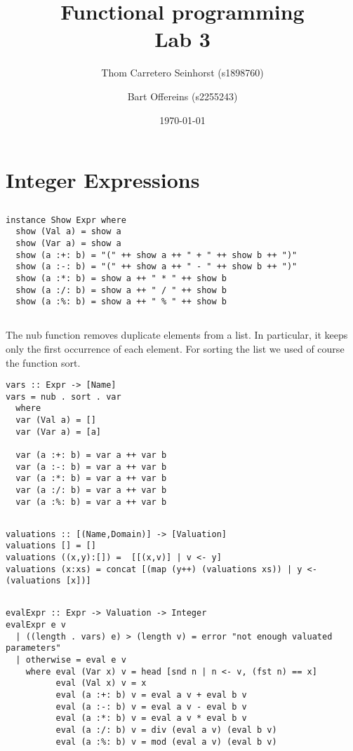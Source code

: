 \documentclass[a4paper,11pt]{article}
\author{Thom Carretero Seinhorst (s1898760) \and Bart Offereins (s2255243)}
\date{\today}
\title{Functional programming \\Lab 3}
\begin{document}
  \maketitle

\section{Integer Expressions}
\subsection{}
\begin{lstlisting}
instance Show Expr where
  show (Val a) = show a
  show (Var a) = show a
  show (a :+: b) = "(" ++ show a ++ " + " ++ show b ++ ")"
  show (a :-: b) = "(" ++ show a ++ " - " ++ show b ++ ")"
  show (a :*: b) = show a ++ " * " ++ show b
  show (a :/: b) = show a ++ " / " ++ show b
  show (a :%: b) = show a ++ " % " ++ show b
\end{lstlisting}

\subsection{}
The nub function removes duplicate elements from a list. In particular, it keeps only the first occurrence of each element. For sorting the list we used of course the function sort. 
\begin{lstlisting}
vars :: Expr -> [Name]
vars = nub . sort . var
  where
  var (Val a) = []
  var (Var a) = [a]

  var (a :+: b) = var a ++ var b
  var (a :-: b) = var a ++ var b
  var (a :*: b) = var a ++ var b
  var (a :/: b) = var a ++ var b
  var (a :%: b) = var a ++ var b
\end{lstlisting}

\subsection{}
\begin{lstlisting}
valuations :: [(Name,Domain)] -> [Valuation]
valuations [] = []
valuations ((x,y):[]) =  [[(x,v)] | v <- y]
valuations (x:xs) = concat [(map (y++) (valuations xs)) | y <- (valuations [x])]
\end{lstlisting}

\subsection{}
\begin{lstlisting}
evalExpr :: Expr -> Valuation -> Integer
evalExpr e v
  | ((length . vars) e) > (length v) = error "not enough valuated parameters"
  | otherwise = eval e v
    where eval (Var x) v = head [snd n | n <- v, (fst n) == x] 
          eval (Val x) v = x
          eval (a :+: b) v = eval a v + eval b v
          eval (a :-: b) v = eval a v - eval b v
          eval (a :*: b) v = eval a v * eval b v
          eval (a :/: b) v = div (eval a v) (eval b v)
          eval (a :%: b) v = mod (eval a v) (eval b v)
\end{lstlisting}
\end{document}

